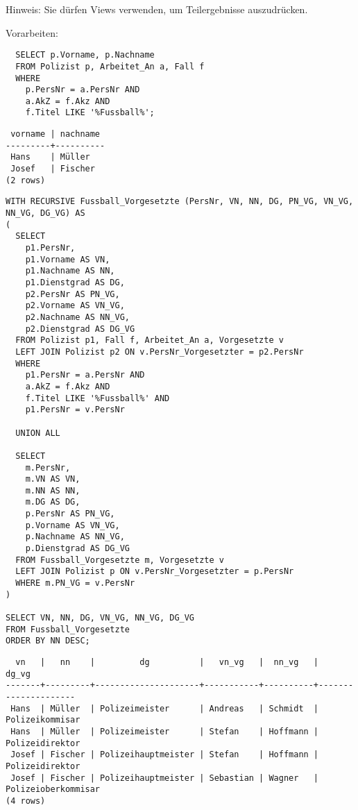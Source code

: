 \documentclass{bschlangaul-aufgabe}
\begin{document}
\begin{enumerate}
Hinweis: Sie dürfen Views verwenden, um Teilergebnisse auszudrücken.

\begin{bAntwort}
Vorarbeiten:
\begin{verbatim}
  SELECT p.Vorname, p.Nachname
  FROM Polizist p, Arbeitet_An a, Fall f
  WHERE
    p.PersNr = a.PersNr AND
    a.AkZ = f.Akz AND
    f.Titel LIKE '%Fussball%';
\end{verbatim}

\begin{verbatim}
 vorname | nachname
---------+----------
 Hans    | Müller
 Josef   | Fischer
(2 rows)
\end{verbatim}


\begin{verbatim}
WITH RECURSIVE Fussball_Vorgesetzte (PersNr, VN, NN, DG, PN_VG, VN_VG, NN_VG, DG_VG) AS
(
  SELECT
    p1.PersNr,
    p1.Vorname AS VN,
    p1.Nachname AS NN,
    p1.Dienstgrad AS DG,
    p2.PersNr AS PN_VG,
    p2.Vorname AS VN_VG,
    p2.Nachname AS NN_VG,
    p2.Dienstgrad AS DG_VG
  FROM Polizist p1, Fall f, Arbeitet_An a, Vorgesetzte v
  LEFT JOIN Polizist p2 ON v.PersNr_Vorgesetzter = p2.PersNr
  WHERE
    p1.PersNr = a.PersNr AND
    a.AkZ = f.Akz AND
    f.Titel LIKE '%Fussball%' AND
    p1.PersNr = v.PersNr

  UNION ALL

  SELECT
    m.PersNr,
    m.VN AS VN,
    m.NN AS NN,
    m.DG AS DG,
    p.PersNr AS PN_VG,
    p.Vorname AS VN_VG,
    p.Nachname AS NN_VG,
    p.Dienstgrad AS DG_VG
  FROM Fussball_Vorgesetzte m, Vorgesetzte v
  LEFT JOIN Polizist p ON v.PersNr_Vorgesetzter = p.PersNr
  WHERE m.PN_VG = v.PersNr
)

SELECT VN, NN, DG, VN_VG, NN_VG, DG_VG
FROM Fussball_Vorgesetzte
ORDER BY NN DESC;
\end{verbatim}

\begin{verbatim}
  vn   |   nn    |         dg          |   vn_vg   |  nn_vg   |        dg_vg
-------+---------+---------------------+-----------+----------+---------------------
 Hans  | Müller  | Polizeimeister      | Andreas   | Schmidt  | Polizeikommisar
 Hans  | Müller  | Polizeimeister      | Stefan    | Hoffmann | Polizeidirektor
 Josef | Fischer | Polizeihauptmeister | Stefan    | Hoffmann | Polizeidirektor
 Josef | Fischer | Polizeihauptmeister | Sebastian | Wagner   | Polizeioberkommisar
(4 rows)
\end{verbatim}


\end{bAntwort}
\end{enumerate}
\end{document}
